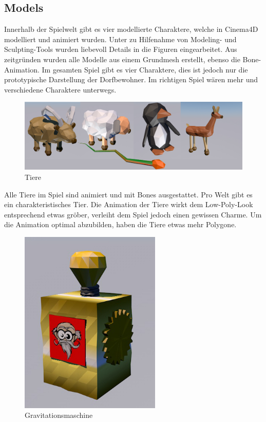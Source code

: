 \subsection{Models}

Innerhalb der Spielwelt gibt es vier modellierte Charaktere, welche in Cinema4D modelliert und animiert wurden. Unter zu Hilfenahme von Modeling- und Sculpting-Tools wurden liebevoll Details in die Figuren eingearbeitet. Aus zeitgründen wurden alle Modelle aus einem Grundmesh erstellt, ebenso die Bone-Animation. Im gesamten Spiel gibt es vier Charaktere, dies ist jedoch nur die prototypische Darstellung der Dorfbewohner. Im richtigen Spiel wären mehr und verschiedene Charaktere unterwegs. 


\begin{figure}[!htbp]%
	\centering
		\includegraphics[width=1.0\textwidth]{images/tiere}
	\caption{Tiere}
	\label{fig:Tiere}
\end{figure}

Alle Tiere im Spiel sind animiert und mit Bones ausgestattet. Pro Welt gibt es ein charakteristisches Tier. Die Animation der Tiere wirkt dem Low-Poly-Look entsprechend etwas gröber, verleiht dem Spiel jedoch einen gewissen Charme. Um die Animation optimal abzubilden, haben die Tiere etwas mehr Polygone. 




\begin{figure}[!htbp]%
	\centering
		\includegraphics[width=0.6\textwidth]{images/gravinator}
	\caption{Gravitationsmaschine}
	\label{fig:gravinator}
\end{figure}


